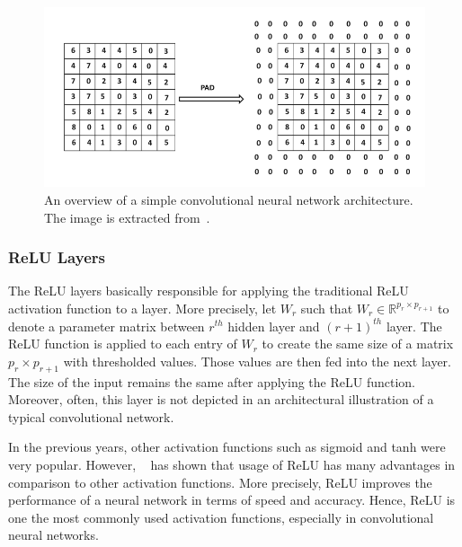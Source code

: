 \begin{figure}[h]
\centering
 \includegraphics[width=\linewidth]{Figures/fig_cnn_padding.png}
 \caption{An overview of a simple convolutional neural network architecture. The image is extracted from~\cite{DBLP:books/sp/Aggarwal18}.}
 \label{fig:cnn_padding}
\end{figure}
\subsubsection{ReLU Layers}
The ReLU layers  basically responsible for applying the traditional ReLU activation function to a layer. More precisely, let $W_r$ such that  $W_r \in \mathbb{R}^{p_r\times p_{r+1}}$ to denote a parameter matrix between $r^{th}$ hidden layer and $(r+1)^{th}$ layer. The ReLU function is applied to each entry of $W_r$ to create the same size of a matrix $p_r\times p_{r+1}$ with thresholded values. Those values are then fed  into the next layer. The size of the input remains the same after applying the ReLU function. Moreover, often, this layer is not depicted in an architectural illustration of a typical convolutional network.  

In the previous years, other activation functions such as sigmoid and tanh were very popular. However, ~\cite{DBLP:conf/nips/KrizhevskySH12} has shown that usage of ReLU has many advantages in comparison to other activation functions. More precisely, ReLU improves the performance of a neural network in terms of speed and accuracy.  Hence, %
ReLU is one the most commonly used activation functions, especially in convolutional neural networks. %
